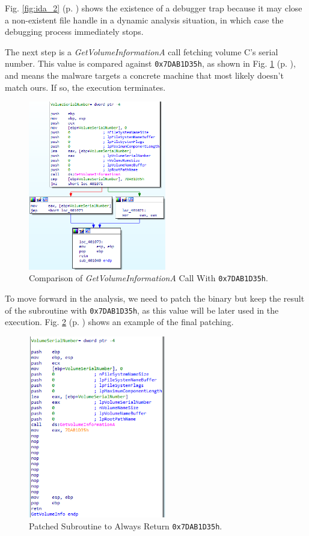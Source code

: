 Fig. \ref{fig:ida_2} (p. \pageref{fig:ida_2}) shows the existence of a debugger trap because it may close a non-existent file handle in a dynamic analysis situation, in which case the debugging process immediately stops.

The next step is a \textit{GetVolumeInformationA} call fetching volume C's serial number. This value is compared against \texttt{0x7DAB1D35h}, as shown in Fig. \ref{fig:ida_3} (p. \pageref{fig:ida_3}), and means the malware targets a concrete machine that most likely doesn't match ours. If so, the execution terminates.

\begin{figure}[H]
    \includegraphics[width=6cm]{figures/ida_3.png}
    \caption{Comparison of \textit{GetVolumeInformationA} Call With \texttt{0x7DAB1D35h}.}
    \label{fig:ida_3}
\end{figure}

To move forward in the analysis, we need to patch the binary but keep the result of the subroutine with \texttt{0x7DAB1D35h}, as this value will be later used in the execution. Fig. \ref{fig:ida_4} (p. \pageref{fig:ida_4}) shows an example of the final patching.

\begin{figure}[H]
    \includegraphics[width=6cm]{figures/ida_4.png}
    \caption{Patched Subroutine to Always Return \texttt{0x7DAB1D35h}.}
    \label{fig:ida_4}
\end{figure}


